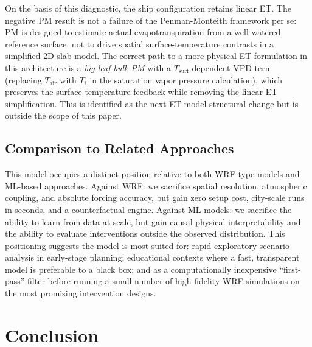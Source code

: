 \documentclass[12pt, letterpaper]{article}
\begin{document}
On the basis of this diagnostic, the ship configuration retains linear ET.
The negative PM result is not a failure of the Penman-Monteith framework
per se: PM is designed to estimate actual evapotranspiration from a
well-watered reference surface, not to drive spatial surface-temperature
contrasts in a simplified 2D slab model. The correct path to a more
physical ET formulation in this architecture is a \emph{big-leaf bulk PM}
with a $T_{\mathrm{surf}}$-dependent VPD term (replacing
$T_{\mathrm{air}}$ with $T_i$ in the saturation vapor pressure
calculation), which preserves the surface-temperature feedback while
removing the linear-ET simplification. This is identified as the next
ET model-structural change but is outside the scope of this paper.

\subsection{Comparison to Related Approaches}

This model occupies a distinct position relative to both WRF-type models
and ML-based approaches. Against WRF: we sacrifice spatial resolution,
atmospheric coupling, and absolute forcing accuracy, but gain zero setup
cost, city-scale runs in seconds, and a counterfactual engine. Against
ML models: we sacrifice the ability to learn from data at scale, but gain
causal physical interpretability and the ability to evaluate interventions
outside the observed distribution. This positioning suggests the model
is most suited for: rapid exploratory scenario analysis in early-stage
planning; educational contexts where a fast, transparent model is
preferable to a black box; and as a computationally inexpensive
``first-pass'' filter before running a small number of high-fidelity
WRF simulations on the most promising intervention designs.

\section{Conclusion}
\label{sec:conclusion}
\end{document}
